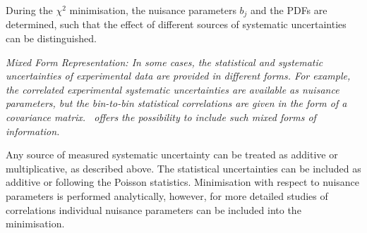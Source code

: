 \begin{description}
During the $\chi^2$ minimisation, the nuisance parameters $b_j$ and the PDFs are determined, such that the effect of different sources of systematic uncertainties can be distinguished.
\item  \it{Mixed Form Representation:} \rm
In some cases, the statistical and systematic uncertainties of experimental data are provided in different forms.    
For example, the correlated experimental systematic uncertainties are available as nuisance parameters,
but the bin-to-bin statistical correlations are given in the form of a covariance matrix.
\fitter\ offers the possibility to include such mixed forms of information. 
\end{description}
Any source of measured systematic uncertainty can be treated as additive or multiplicative, as described above. 
The statistical uncertainties can be included as additive or following the Poisson statistics. Minimisation
with respect to nuisance parameters is performed analytically, however, for more 
detailed studies of correlations individual nuisance parameters can be included into 
the \minuit minimisation.



